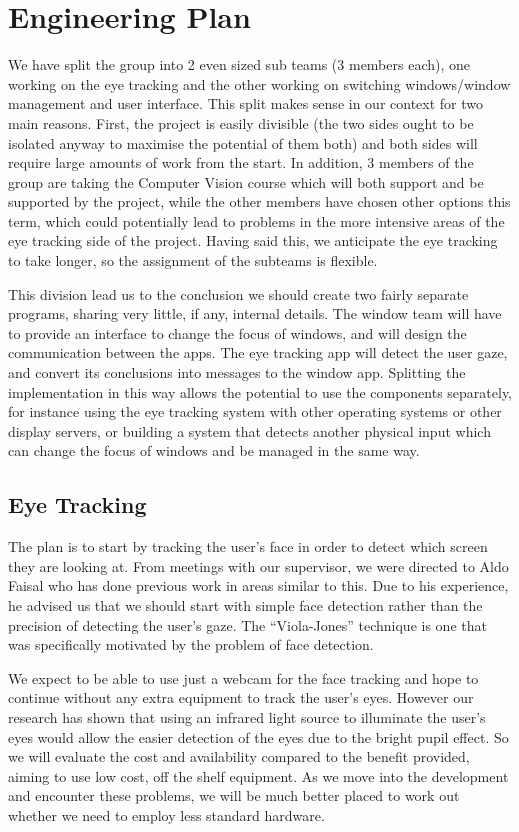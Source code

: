 \documentclass{article}
\begin{document}
\clearpage
\section*{Engineering Plan}
We have split the group into 2 even sized sub teams (3 members each), one working on the eye tracking and the other working on switching windows/window management and user interface. This split makes sense in our context for two main reasons. First, the project is easily divisible (the two sides ought to be isolated anyway to maximise the potential of them both) and both sides will require large amounts of work from the start. In addition, 3 members of the group are taking the Computer Vision course which will both support and be supported by the project, while the other members have chosen other options this term, which could potentially lead to problems in the more intensive areas of the eye tracking side of the project. Having said this, we anticipate the eye tracking to take longer, so the assignment of the subteams is flexible. 

This division lead us to the conclusion we should create two fairly separate programs, sharing very little, if any, internal details. The window team will have to provide an interface to change the focus of windows, and will design the communication between the apps. The eye tracking app will detect the user gaze, and convert its conclusions into messages to the window app. Splitting the implementation in this way allows the potential to use the components separately, for instance using the eye tracking system with other operating systems or other display servers, or building a system that detects another physical input which can change the focus of windows and be managed in the same way.

\subsection*{Eye Tracking}
The plan is to start by tracking the user's face in order to detect which screen they are looking at. From meetings with our supervisor, we were directed to Aldo Faisal who has done previous work in areas similar to this. Due to his experience, he advised us that we should start with simple face detection rather than the precision of detecting the user’s gaze.  The “Viola-Jones” technique is one that was specifically motivated by the problem of face detection.

We expect to be able to use just a webcam for the face tracking and hope to continue without any extra equipment to track the user’s eyes. However our research has shown that using an infrared light source to illuminate the user’s eyes would allow the easier detection of the eyes due to the bright pupil effect. So we will evaluate the cost and availability compared to the benefit provided, aiming to use low cost, off the shelf equipment. As we move into the development and encounter these problems, we will be much better placed to work out whether we need to employ less standard hardware.
\end{document}
